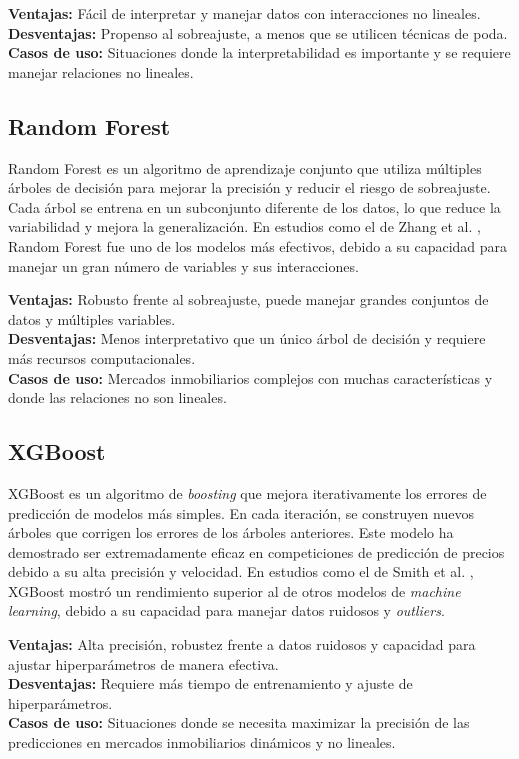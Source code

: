 \textbf{Ventajas:} Fácil de interpretar y manejar datos con interacciones no lineales.\\
\textbf{Desventajas:} Propenso al sobreajuste, a menos que se utilicen técnicas de poda.\\
\textbf{Casos de uso:} Situaciones donde la interpretabilidad es importante y se requiere manejar relaciones no lineales.

\subsection*{Random Forest}
Random Forest es un algoritmo de aprendizaje conjunto que utiliza múltiples árboles de decisión para mejorar la precisión y reducir el riesgo de sobreajuste. Cada árbol se entrena en un subconjunto diferente de los datos, lo que reduce la variabilidad y mejora la generalización. En estudios como el de Zhang et al. \cite{zhang2018realestate}, Random Forest fue uno de los modelos más efectivos, debido a su capacidad para manejar un gran número de variables y sus interacciones.

\textbf{Ventajas:} Robusto frente al sobreajuste, puede manejar grandes conjuntos de datos y múltiples variables.\\
\textbf{Desventajas:} Menos interpretativo que un único árbol de decisión y requiere más recursos computacionales.\\
\textbf{Casos de uso:} Mercados inmobiliarios complejos con muchas características y donde las relaciones no son lineales.

\subsection*{XGBoost}
XGBoost es un algoritmo de \textit{boosting} que mejora iterativamente los errores de predicción de modelos más simples. En cada iteración, se construyen nuevos árboles que corrigen los errores de los árboles anteriores. Este modelo ha demostrado ser extremadamente eficaz en competiciones de predicción de precios debido a su alta precisión y velocidad. En estudios como el de Smith et al. \cite{bigdata2019realestate}, XGBoost mostró un rendimiento superior al de otros modelos de \textit{machine learning}, debido a su capacidad para manejar datos ruidosos y \textit{outliers}.

\textbf{Ventajas:} Alta precisión, robustez frente a datos ruidosos y capacidad para ajustar hiperparámetros de manera efectiva.\\
\textbf{Desventajas:} Requiere más tiempo de entrenamiento y ajuste de hiperparámetros.\\
\textbf{Casos de uso:} Situaciones donde se necesita maximizar la precisión de las predicciones en mercados inmobiliarios dinámicos y no lineales.

